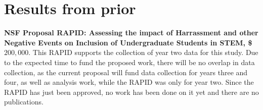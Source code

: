 \section{Results from prior}
\label{sec:prior-work}

\noindent \textbf{NSF Proposal RAPID: Assessing the impact of Harrassment and other Negative Events on Inclusion of Undergraduate Students in STEM, \$$200,000$}. This RAPID supports the collection of year two data for this study. Due to the expected time to fund the proposed work, there will be no overlap in data collection, as the current proposal will fund data collection for years three and four, as well as analysis work, while the RAPID was only for year two. Since the RAPID has just been approved, no work has been done on it yet and there are no publications. 


